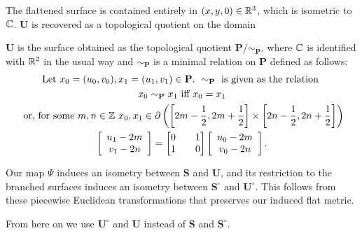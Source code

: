 \documentclass[]{article}
\def\bU{\mathbf{U}} \def\btU{\tilde{\bU}} \def\bUs{\bU^\circ}
\begin{document}
The flattened surface is contained entirely in $(x,y,0)\in\mathbb{R}^3$, which is isometric to $\mathbb{C}$. $\bU$ is recovered as a topological quotient on the domain



\begin{Def} $\mathbf U$ is the surface obtained as the topological quotient $\mathbf{P}/\sim_{\mathbf{P}}$, where $\mathbb{C}$ is identified with $\mathbb{R}^2$ in the usual way and $\sim_{\mathbf{P}}$ is a minimal relation on $\mathbf{P}$ defined as follows:
\begin{gather*}
\text{Let } x_{0}=(u_{0},v_{0}),x_{1}=(u_{1},v_{1}) \in \mathbf{P}.  \text{ }\sim_{\mathbf{P}} \text { is given as the relation }\\ x_{0}\sim_{\mathbf{P}}x_{1}  \text{ iff } x_{0}=x_{1}
 \\\text{ or, for some }m,n\in\mathbb{Z}~x_{0},x_{1} \in {\partial} \left( \left[2m-\frac{1}{2},2m+\frac{1}{2}\right] \times \left[2n-\frac{1}{2},2n+\frac{1}{2}\right] \right)\\
  \left[\begin{array}{c}
u_{1} -2m
\\v_{1}-2n
\end{array}\right] = \left[\begin{matrix}
0 && 1\\
1 && 0
\end{matrix}\right]
\left[ \begin{array}{c}u_{0}-2m\\
v_{0}-2n
\end{array}\right]
.\end{gather*}\end{Def}

\begin{rem}
Our map $\Psi$ induces an isometry between $\mathbf{S}$ and $\bU$, and its restriction to the branched surfaces induces an isometry between $\mathbf{S}^\circ$ and $\bUs$. This follows from these piecewise Euclidean transformations that preserves our induced flat metric.
\end{rem}
From here on we use $\bUs$ and $\bU$ instead of $\mathbf{S}$ and $\mathbf{S}^\circ$.
\end{document}
